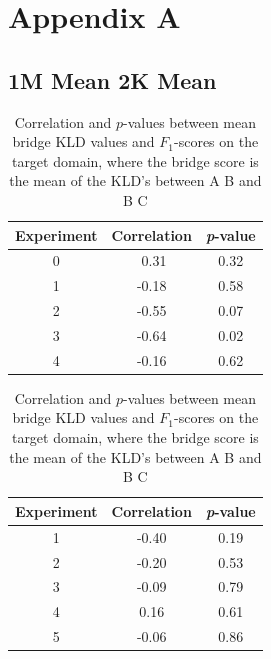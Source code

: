 \documentclass[11pt,a4paper]{article}
\begin{document}
\onecolumn
\newpage
\section*{Appendix A}
\subsection*{\centering 1M Mean \hspace{150} 2K Mean}
\begin{table}[h]
\centering
    \begin{tabular}{|c|c|c|}
    \hline
     \textbf{Experiment} & \textbf{Correlation} & \textbf{\textit{p}-value} \\ \hline
     0 & \,\,0.31 & 0.32 \\ \hline
     1 & -0.18 & 0.58 \\ \hline
     2 & -0.55 & 0.07 \\ \hline
     3 & -0.64 & 0.02 \\ \hline
     4 & -0.16 & 0.62 \\ \hline
    \end{tabular}
\hspace{2em}
    \begin{tabular}{|c|c|c|}
    \hline
     \textbf{Experiment} & \textbf{Correlation} & \textbf{\textit{p}-value} \\ \hline
     1 & -0.40 & 0.19 \\ \hline
     2 & -0.20 & 0.53 \\ \hline
     3 & -0.09 & 0.79 \\ \hline
     4 &  0.16 & 0.61 \\ \hline
     5 & -0.06 & 0.86 \\ \hline
    \end{tabular}
\caption{Correlation and $p$-values between mean bridge KLD values and $F_1$-scores on the target domain, where the bridge score is the mean of the KLD's between A \textrightarrow B and B \textrightarrow C}
\end{table}
\end{document}
